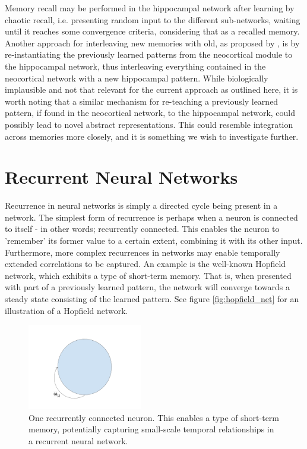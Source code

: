 Memory recall may be performed in the hippocampal network after learning by chaotic recall, i.e. presenting random input to the different sub-networks, waiting until it reaches some convergence criteria, considering that as a recalled memory. Another approach for interleaving new memories with old, as proposed by \cite{French1997}, is by re-instantiating the previously learned patterns from the neocortical module to the hippocampal network, thus interleaving everything contained in the neocortical network with a new hippocampal pattern. While biologically implausible and not that relevant for the current approach as outlined here, it is worth noting that a similar mechanism for re-teaching a previously learned pattern, if found in the neocortical network, to the hippocampal network, could possibly lead to novel abstract representations. This could resemble integration across memories more closely, and it is something we wish to investigate further.


\section{Recurrent Neural Networks}

Recurrence in neural networks is simply a directed cycle being present in a network. The simplest form of recurrence is perhaps when a neuron is connected to itself - in other words; recurrently connected. This enables the neuron to 'remember' its former value to a certain extent, combining it with its other input. Furthermore, more complex recurrences in networks may enable temporally extended correlations to be captured. An example is the well-known Hopfield network, which exhibits a type of short-term memory. That is, when presented with part of a previously learned pattern, the network will converge towards a steady state consisting of the learned pattern. See figure \ref{fig:hopfield_net} for an illustration of a Hopfield network.

\begin{figure}
\centering
\includegraphics[width=5cm]{fig/one_recurrent_neuron}
\caption{One recurrently connected neuron. This enables a type of short-term memory, potentially capturing small-scale temporal relationships in a recurrent neural network.}
\label{fig:one_recurrent_neuron}
\end{figure}

